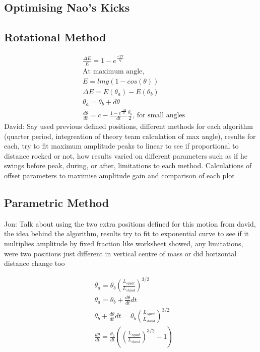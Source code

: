 \documentclass[11pt]{article}
\begin{document}
\subsection{Optimising Nao's Kicks}

\subsection{Rotational Method}

\begin{align}
    &\frac{\Delta E}{E} = 1 - e^{\frac{-2\pi}{Q}}\\
    &\text{At maximum angle},\\
    &E = lmg(1-cos(\theta))\\
    &\Delta E = E(\theta_a) - E(\theta_b)\\
    &\theta_a = \theta_b + d\theta\\
    &\frac{d\theta}{dt} = c - \frac{1-e^{\frac{-2\pi}{Q}}}{dt}\frac{\theta_b}{2}, \, \text{for small angles}
\end{align}
David: Say used previous defined positions, different methods for each algorithm (quarter period, integreation of theory team calculation of max angle), results for each, try to fit maximum amplitude peaks to linear to see if proportional to distance rocked or not, how results varied on different parameters such as if he swings before peak, during, or after, limitations to each method.
Calculations of offset parameters to maximise amplitude gain and comparison of each plot

\subsection{Parametric Method}
Jon: Talk about using the two extra positions defined for this motion from david, the idea behind the algorithm, results try to fit to exponential curve to see if it multiplies amplitude by fixed fraction like worksheet showed, any limitations, were two positions just different in vertical centre of mass or did horizontal distance change too

\begin{align}
    &\theta_a = \theta_b (\frac{L_{squat}}{L_{stand}})^{3/2}\\
    &\theta_a = \theta_b + \frac{d\theta}{dt}dt\\
    &\theta_b + \frac{d\theta}{dt}dt = \theta_b (\frac{L_{squat}}{L_{stand}})^{3/2}\\
    &\frac{d\theta}{dt} = \frac{\theta_b}{dt} ((\frac{L_{squat}}{L_{stand}})^{3/2} - 1)\\ 
\end{align}
\end{document}

